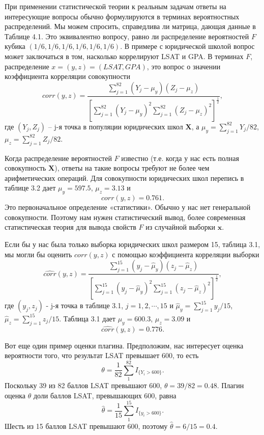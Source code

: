 При применении статистической теории к реальным задачам ответы на интересующие вопросы обычно формулируются в терминах вероятностных распределений. Мы можем спросить, справедлива ли матрица, дающая данные в Таблице 4.1. Это эквивалентно вопросу, равно ли распределение вероятностей $F$ кубика $(1/6, 1/6, 1/6, 1/6, 1/6, 1/6)$. В примере с юридической школой вопрос может заключаться в том, насколько коррелируют LSAT и GPA. В терминах $F$, распределение $x = (y, z) = (LSAT, GPA)$, это вопрос о значении коэффициента корреляции совокупности
\begin{equation}
    corr(y,z)=\frac{\sum_{j=1}^{82}(Y_j-\mu_y)(Z_j-\mu_z)}{[\sum_{j=1}^{82}(Y_j-\mu_y)^2\sum_{j=1}^{82}(Z_j-\mu_z)^2]^\frac{1}{2}},
\end{equation}
где $(Y_j, Z_j)$ -- j-я точка в популяции юридических школ $\mathbf{X}$, а $\mu_y = \sum_{j=1}^{82} Y_j / 82$, $\mu_z = \sum_{j=1}^{82} Z_j / 82$.

Когда распределение вероятностей $F$ известно (т.е. когда у нас есть полная совокупность $\mathbf{X}$), ответы на такие вопросы требуют не более чем арифметических операций. Для совокупности юридических школ перепись в таблице 3.2 дает $\mu_y = 597.5$, $\mu_z = 3.13$ и 
\begin{equation}
    corr(y,z)=0.761.
\end{equation}
Это первоначальное определение «статистики». Обычно у нас нет генеральной совокупности. Поэтому нам нужен статистический вывод, более современная статистическая теория для вывода свойств $F$ из случайной выборки $\mathbf{x}$. 

Если бы у нас была только выборка юридических школ размером 15, таблица 3.1, мы могли бы оценить $corr (y, z)$ с помощью коэффициента корреляции выборки 
\begin{equation}
    \widehat{corr}(y,z)=\frac{\sum_{j=1}^{15}(y_j-\hat\mu_y)(z_j-\hat\mu_z)}{[\sum_{j=1}^{15}(y_j-\hat\mu_y)^2\sum_{j=1}^{15}(z_j-\hat\mu_z)^2]^\frac{1}{2}},
\end{equation}
где $(y_j, z_j)$ - j-я точка в таблице 3.1, $j = 1, 2, \cdots, 15$ и $\hat\mu_y = \sum_{j=1}^{15}y_j/15$, $\hat\mu_z = \sum_{j=1}^{15}z_j / 15$. Таблица 3.1 дает $\mu_y = 600.3$, $\mu_z = 3.09$ и 
\begin{equation}
    \widehat{corr}(y,z)=0.776.
\end{equation}

Вот еще один пример оценки плагина. Предположим, нас интересует оценка вероятности того, что результат LSAT превышает 600, то есть 
\begin{equation}
    \theta=\frac{1}{82}\sum_1^{82}I_{\{Y_i>600\}}.
\end{equation}
Поскольку 39 из 82 баллов LSAT превышают 600, $\theta = 39/82 = 0.48$. Плагин оценка $\theta$ доли баллов LSAT, превышающих 600, равна 
\begin{equation}
    \hat\theta=\frac{1}{15}\sum_1^{15}I_{\{y_i>600\}}.
\end{equation}
Шесть из 15 баллов LSAT превышают 600, поэтому $\hat\theta = 6/15 = 0.4$. 

